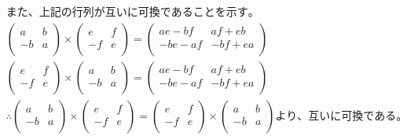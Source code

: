 \documentclass[dvipdfmx,uplatex]{jsarticle}
\begin{document}
\begin{equation}
\begin{aligned}
        &また、上記の行列が互いに可換であることを示す。\nonumber\\
        &\begin{pmatrix} a & b \\ -b & a \\ \end{pmatrix} \times \begin{pmatrix} e & f \\ -f & e \\ \end{pmatrix} = \begin{pmatrix} ae-bf & af+eb \\ -be-af & -bf+ea \\ \end{pmatrix} \nonumber\\
        &\begin{pmatrix} e & f \\ -f & e \\ \end{pmatrix} \times \begin{pmatrix} a & b \\ -b & a \\ \end{pmatrix} = \begin{pmatrix} ae-bf & af+eb \\ -be-af & -bf+ea \\ \end{pmatrix} \nonumber\\
        & \therefore \begin{pmatrix} a & b \\ -b & a \\ \end{pmatrix} \times \begin{pmatrix} e & f \\ -f & e \\ \end{pmatrix} = \begin{pmatrix} e & f \\ -f & e \\ \end{pmatrix} \times \begin{pmatrix} a & b \\ -b & a \\ \end{pmatrix} より、互いに可換である。\nonumber\\
    \end{aligned}
  \end{equation}
\end{document}
